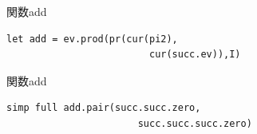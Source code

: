 \documentclass[pdflatex,12pt]{beamer}
\begin{document}
\begin{frame}[fragile]{関数add}
    \centering
    \begin{lstlisting}[basicstyle=\ttfamily]
    let add = ev.prod(pr(cur(pi2),
                         cur(succ.ev)),I)
    \end{lstlisting}
\end{frame}

\begin{frame}[fragile]{関数add}
    \centering
    \begin{lstlisting}[basicstyle=\ttfamily]
    simp full add.pair(succ.succ.zero,
                       succ.succ.succ.zero)
    \end{lstlisting}
\end{frame}
\end{document}
